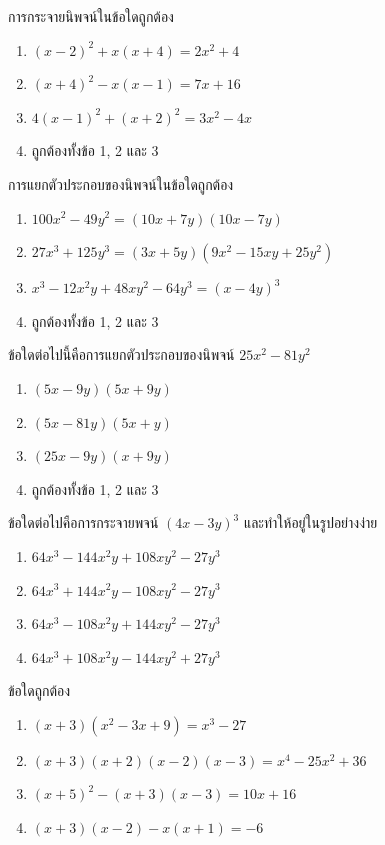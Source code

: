 \begin{examplebox}
การกระจายนิพจน์ในข้อใดถูกต้อง
\begin{enumerate}
\item $(x-2)^2+x(x+4)=2 x^2+4$
\item $(x+4)^2-x(x-1)=7 x+16$
\item $4(x-1)^2+(x+2)^2=3 x^2-4 x$
\item ถูกต้องทั้งข้อ 1, 2 และ 3
\end{enumerate}
\end{examplebox}
\newpage
\begin{examplebox}
การแยกตัวประกอบของนิพจน์ในข้อใดถูกต้อง
\begin{enumerate}
\item $100 x^2-49 y^2=(10 x+7 y)(10 x-7 y)$
\item $27 x^3+125 y^3=(3 x+5 y)\left(9 x^2-15 x y+25 y^2\right)$
\item $x^3-12 x^2 y+48 x y^2-64 y^3=(x-4 y)^3$
\item ถูกต้องทั้งข้อ 1, 2 และ 3
\end{enumerate}
\end{examplebox}
\newpage
\begin{examplebox}
ข้อใดต่อไปนี้คือการแยกตัวประกอบของนิพจน์ $25 x^2-81 y^2$
\begin{enumerate}
\item $(5 x-9 y)(5 x+9 y)$
\item $(5 x-81 y)(5 x+y)$
\item $(25 x-9 y)(x+9 y)$
\item ถูกต้องทั้งข้อ 1, 2 และ 3
\end{enumerate}
\end{examplebox}
\newpage
\begin{examplebox}
ข้อใดต่อไปคือการกระจายพจน์ $(4 x-3 y)^3$ และทำให้อยู่ในรูปอย่างง่าย
\begin{enumerate}
\item $64 x^3-144 x^2 y+108 x y^2-27 y^3$
\item $64 x^3+144 x^2 y-108 x y^2-27 y^3$
\item $64 x^3-108 x^2 y+144 x y^2-27 y^3$
\item $64 x^3+108 x^2 y-144 x y^2+27 y^3$
\end{enumerate}
\end{examplebox}

\newpage
\begin{examplebox}
ข้อใดถูกต้อง
\begin{enumerate}
\item $(x+3)\left(x^2-3 x+9\right)=x^3-27$
\item $(x+3)(x+2)(x-2)(x-3)=x^4-25 x^2+36$
\item $(x+5)^2-(x+3)(x-3)=10 x+16$
\item $(x+3)(x-2)-x(x+1)=-6$
\end{enumerate}
\end{examplebox}

